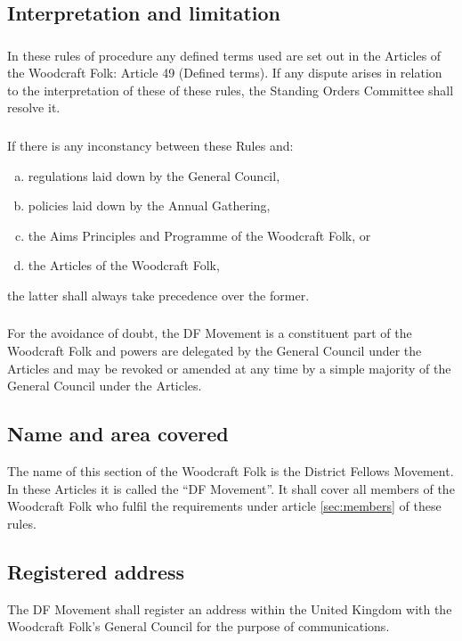 \documentclass[a4paper, 12pt]{report}
\begin{document}
\subsection{Interpretation and limitation}
\subsubsection{}
In these rules of procedure any defined terms used are set out in the Articles of the Woodcraft Folk: Article 49 (Defined terms). If any dispute arises in relation to the interpretation of these of these rules, the Standing Orders Committee shall resolve it.
\subsubsection{}
If there is any inconstancy between these Rules and:
\begin{enumerate}[(a)]
\item regulations laid down by the General Council,
\item policies laid down by the Annual Gathering,
\item the Aims Principles and Programme of the Woodcraft Folk, or
\item the Articles of the Woodcraft Folk,
\end{enumerate}
the latter shall always take precedence over the former.

\subsubsection{}
For the avoidance of doubt, the DF Movement is a constituent part of the Woodcraft Folk and powers are delegated by the General Council under the Articles and may be revoked or amended at any time by a simple majority of the General Council under the Articles.

\subsection{Name and area covered}
The name of this section of the Woodcraft Folk is the District Fellows Movement. In these Articles it is called the ``DF Movement''. It shall cover all members of the Woodcraft Folk who fulfil the requirements under article \ref{sec:members} of these rules.

\subsection{Registered address}
The DF Movement shall register an address within the United Kingdom with the Woodcraft Folk's General Council for the purpose of communications.
\end{document}
